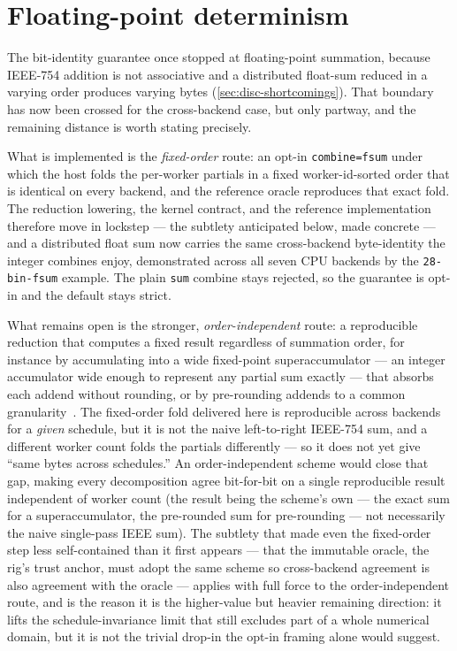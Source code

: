 \section{Floating-point determinism}\label{sec:fw-float}

The bit-identity guarantee once stopped at floating-point summation, because IEEE-754
addition is not associative and a distributed float-sum reduced in a varying order
produces varying bytes (\cref{sec:disc-shortcomings}). That boundary has now been
crossed for the cross-backend case, but only partway, and the remaining distance is
worth stating precisely.

What is implemented is the \emph{fixed-order} route: an opt-in \texttt{combine=fsum}
under which the host folds the per-worker partials in a fixed worker-id-sorted order
that is identical on every backend, and the reference oracle reproduces that exact
fold. The reduction lowering, the kernel contract, and the reference implementation
therefore move in lockstep --- the subtlety anticipated below, made concrete --- and a
distributed float sum now carries the same cross-backend byte-identity the integer
combines enjoy, demonstrated across all seven CPU backends by the \texttt{28-bin-fsum}
example. The plain \texttt{sum} combine stays rejected, so the guarantee is opt-in and
the default stays strict.

What remains open is the stronger, \emph{order-independent} route: a reproducible
reduction that computes a fixed result regardless of summation order, for instance by
accumulating into a wide fixed-point superaccumulator --- an integer accumulator wide
enough to represent any partial sum exactly --- that absorbs each addend without
rounding, or by pre-rounding addends to a common
granularity~\cite{demmel2013reproducible}. The fixed-order fold delivered here is
reproducible across backends for a \emph{given} schedule, but it is not the naive
left-to-right IEEE-754 sum, and a different worker count folds the partials
differently --- so it does not yet give ``same bytes across schedules.'' An
order-independent scheme would close that gap, making every decomposition agree
bit-for-bit on a single reproducible result independent of worker count (the result
being the scheme's own --- the exact sum for a superaccumulator, the pre-rounded sum
for pre-rounding --- not necessarily the naive single-pass IEEE sum). The subtlety that
made even the fixed-order step less self-contained than it first appears --- that the
immutable oracle, the rig's trust anchor, must adopt the same scheme so cross-backend
agreement is also agreement with the oracle --- applies with full force to the
order-independent route, and is the reason it is the higher-value but heavier
remaining direction: it lifts the schedule-invariance limit that still excludes part
of a whole numerical domain, but it is not the trivial drop-in the opt-in framing
alone would suggest.

